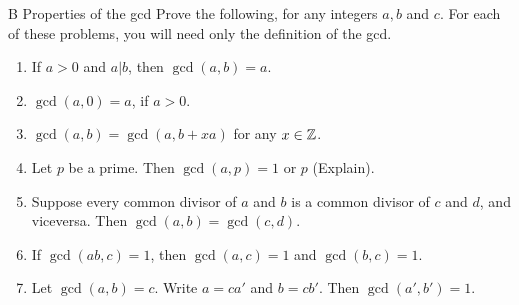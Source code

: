 \begin{exercise}{B Properties of the gcd}
Prove the following, for any integers $a,b$ and $c$. For each of these problems, you will need only the definition of the gcd.
\begin{enumerate}
    \item If $a>0$ and $a\vert b$, then $\gcd(a,b)=a$.
    \item $\gcd(a,0)=a$, if $a>0$.
    \item $\gcd(a,b)=\gcd(a,b+xa)$ for any $x\in \mathbb{Z}$.
    \item Let $p$ be a prime. Then $\gcd(a,p)=1$ or $p$ (Explain).
    \item Suppose every common divisor of $a$ and $b$ is a common divisor of $c$ and $d$, and viceversa. Then $\gcd(a,b)=\gcd(c,d)$.
    \item If $\gcd(ab,c)=1$, then $\gcd(a,c)=1$ and $\gcd(b,c)=1$.
    \item Let $\gcd(a,b)=c$. Write $a=ca'$ and $b=cb'$. Then $\gcd(a',b')=1$.
\end{enumerate}
\end{exercise}
